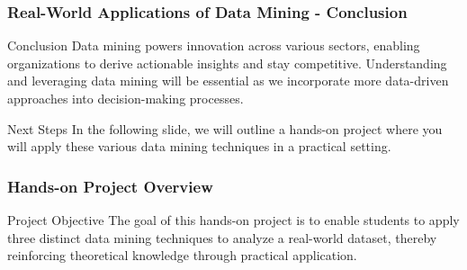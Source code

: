 \documentclass[aspectratio=169]{beamer}
\begin{document}
\begin{frame}[fragile]
    \frametitle{Real-World Applications of Data Mining - Conclusion}
    \begin{block}{Conclusion}
        Data mining powers innovation across various sectors, enabling organizations to derive actionable insights and stay competitive. Understanding and leveraging data mining will be essential as we incorporate more data-driven approaches into decision-making processes.
    \end{block}
    \begin{block}{Next Steps}
        In the following slide, we will outline a hands-on project where you will apply these various data mining techniques in a practical setting.
    \end{block}
\end{frame}

\begin{frame}
    \frametitle{Hands-on Project Overview}
    \begin{block}{Project Objective}
        The goal of this hands-on project is to enable students to apply three distinct data mining techniques to analyze a real-world dataset, thereby reinforcing theoretical knowledge through practical application.
    \end{block}
\end{frame}
\end{document}
